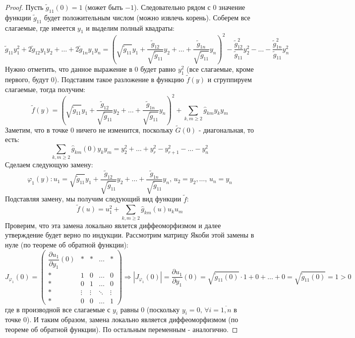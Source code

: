 \documentclass[12pt]{article}
\theoremstyle{definition}
\newcommand{\wte}[1]{\widetilde{#1}}
\begin{document}
\begin{proof}
	Пусть $\widetilde{g}_{11}(0) = 1$ (может быть $-1$). Следовательно рядом с $0$ значение функции $\wte{g}_{11}$ будет положительным числом (можно извлечь корень). Соберем все слагаемые, где имеется $y_1$ и выделим полный квадраты:
	$$
		\wte{g}_{11}y_1^2 + 2\wte{g}_{12}y_1 y_2 + \dotsc + 2 \wte{g}_{1n}y_1 y_n = \left(\sqrt{\wte{g}_{11}}y_1 + \dfrac{\wte{g}_{12}}{\sqrt{\wte{g}_{11}}} y_2 + \dotsc + \dfrac{\wte{g}_{1n}}{\sqrt{\wte{g}_{11}}} y_n \right)^2 - \dfrac{\wte{g}_{12}^2}{\wte{g}_{11}} y_2^2 - \dotsc - \dfrac{\wte{g}_{1n}^2}{\wte{g}_{11}} y_n^2
	$$
	Нужно отметить, что данное выражение в $0$ будет равно $y_1^2$ (все слагаемые, кроме первого, будут $0$). Подставим такое разложение в функцию $\wte{f}(y)$ и сгруппируем слагаемые, тогда получим:
	$$
		\wte{f}(y) = \left(\sqrt{\wte{g}_{11}}y_1 + \dfrac{\wte{g}_{12}}{\sqrt{\wte{g}_{11}}} y_2 + \dotsc + \dfrac{\wte{g}_{1n}}{\sqrt{\wte{g}_{11}}} y_n \right)^2 + \sum\limits_{k,m \geq 2}\widehat{g}_{km}y_ky_m
	$$
	Заметим, что в точке $0$ ничего не изменится, поскольку $\wte{G}(0)$ - диагональная, то есть:
	$$
		\sum\limits_{k,m \geq 2}\widehat{g}_{km}(0)y_ky_m = y_2^2 + \dotsc + y_r^2 - y_{r+1}^2 - \dotsc - y_n^2
	$$
	Сделаем следующую замену:
	$$
		\varphi_1(y) \colon u_1 = \sqrt{\wte{g}_{11}}y_1 + \dfrac{\wte{g}_{12}}{\sqrt{\wte{g}_{11}}} y_2 + \dotsc + \dfrac{\wte{g}_{1n}}{\sqrt{\wte{g}_{11}}} y_n, \, u_2 = y_2, \dotsc, \, u_n = y_n
	$$
	Подставляя замену, мы получим следующий вид функции $\wte{f}$:
	$$
		\wte{f}(u) = u_1^2 + \sum\limits_{k,m \geq 2}\widehat{g}_{km}(u)u_k u_m
	$$
	Проверим, что эта замена локально явлется диффеоморфизмом и далее утверждение будет верно по индукции. Рассмотрим матрицу Якоби этой замены в нуле (по теореме об обратной функции):
	$$
		J_{\varphi_1}(0) = 
		\begin{pmatrix}
			\dfrac{\partial u_1}{\partial y_1}(0) & * & * & \dotsc & * \\
			* & 1 & 0 & \dotsc & 0 \\
			* & 0 & 1 & \dotsc & 0 \\
			* & \vdots & \vdots & \ddots & \vdots \\
			* & 0 & 0 & \dotsc & 1
		\end{pmatrix} \Rightarrow |J_{\varphi_1}(0)| = \dfrac{\partial u_1}{\partial y_1}(0) = \sqrt{\wte{g}_{11}(0)}{\cdot}1 + 0 + \dotsc + 0 = \sqrt{\wte{g}_{11}(0)} = 1 > 0
	$$
	где в производной все слагаемые с $y_i$ равны $0$ (поскольку $y_i =0 ,\, \forall i = \overline{1,n}$ в точке $0$). И таким образом, замена локально является диффеоморфизмом (по теореме об обратной функции). По остальным переменным - аналогично.
\end{proof}
\end{document}

